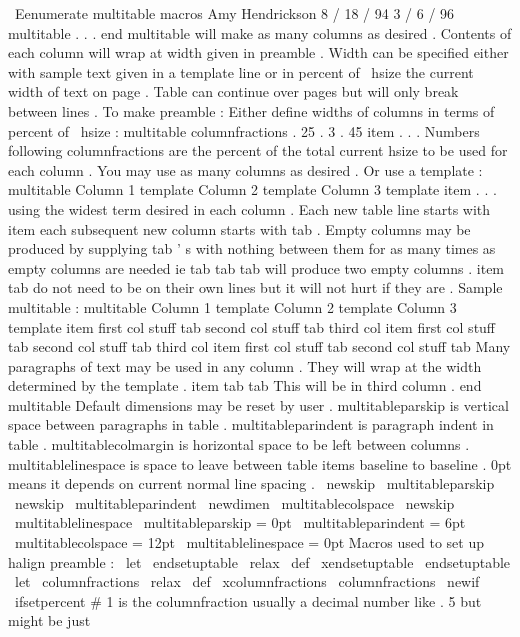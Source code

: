 {{\
Eenumerate
}
%
multitable
macros
%
Amy
Hendrickson
8
/
18
/
94
3
/
6
/
96
%
%
multitable
.
.
.
end
multitable
will
make
as
many
columns
as
desired
.
%
Contents
of
each
column
will
wrap
at
width
given
in
preamble
.
Width
%
can
be
specified
either
with
sample
text
given
in
a
template
line
%
or
in
percent
of
\
hsize
the
current
width
of
text
on
page
.
%
Table
can
continue
over
pages
but
will
only
break
between
lines
.
%
To
make
preamble
:
%
%
Either
define
widths
of
columns
in
terms
of
percent
of
\
hsize
:
%
multitable
columnfractions
.
25
.
3
.
45
%
item
.
.
.
%
%
Numbers
following
columnfractions
are
the
percent
of
the
total
%
current
hsize
to
be
used
for
each
column
.
You
may
use
as
many
%
columns
as
desired
.
%
Or
use
a
template
:
%
multitable
{
Column
1
template
}
{
Column
2
template
}
{
Column
3
template
}
%
item
.
.
.
%
using
the
widest
term
desired
in
each
column
.
%
Each
new
table
line
starts
with
item
each
subsequent
new
column
%
starts
with
tab
.
Empty
columns
may
be
produced
by
supplying
tab
'
s
%
with
nothing
between
them
for
as
many
times
as
empty
columns
are
needed
%
ie
tab
tab
tab
will
produce
two
empty
columns
.
%
item
tab
do
not
need
to
be
on
their
own
lines
but
it
will
not
hurt
%
if
they
are
.
%
Sample
multitable
:
%
multitable
{
Column
1
template
}
{
Column
2
template
}
{
Column
3
template
}
%
item
first
col
stuff
tab
second
col
stuff
tab
third
col
%
item
%
first
col
stuff
%
tab
%
second
col
stuff
%
tab
%
third
col
%
item
first
col
stuff
tab
second
col
stuff
%
tab
Many
paragraphs
of
text
may
be
used
in
any
column
.
%
%
They
will
wrap
at
the
width
determined
by
the
template
.
%
item
tab
tab
This
will
be
in
third
column
.
%
end
multitable
%
Default
dimensions
may
be
reset
by
user
.
%
multitableparskip
is
vertical
space
between
paragraphs
in
table
.
%
multitableparindent
is
paragraph
indent
in
table
.
%
multitablecolmargin
is
horizontal
space
to
be
left
between
columns
.
%
multitablelinespace
is
space
to
leave
between
table
items
baseline
%
to
baseline
.
%
0pt
means
it
depends
on
current
normal
line
spacing
.
%
\
newskip
\
multitableparskip
\
newskip
\
multitableparindent
\
newdimen
\
multitablecolspace
\
newskip
\
multitablelinespace
\
multitableparskip
=
0pt
\
multitableparindent
=
6pt
\
multitablecolspace
=
12pt
\
multitablelinespace
=
0pt
%
Macros
used
to
set
up
halign
preamble
:
%
\
let
\
endsetuptable
\
relax
\
def
\
xendsetuptable
{
\
endsetuptable
}
\
let
\
columnfractions
\
relax
\
def
\
xcolumnfractions
{
\
columnfractions
}
\
newif
\
ifsetpercent
%
#
1
is
the
columnfraction
usually
a
decimal
number
like
.
5
but
might
%
be
just
}
